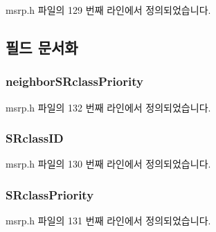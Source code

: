 msrp.\+h 파일의 129 번째 라인에서 정의되었습니다.



\subsection{필드 문서화}
\subsubsection[{\texorpdfstring{neighbor\+S\+Rclass\+Priority}{neighborSRclassPriority}}]{ neighbor\+S\+Rclass\+Priority}\hypertarget{structmsrpdu__domain_ae9e61b028a38f302a5888dc230ec3bf2}{}\label{structmsrpdu__domain_ae9e61b028a38f302a5888dc230ec3bf2}


msrp.\+h 파일의 132 번째 라인에서 정의되었습니다.

\subsubsection[{\texorpdfstring{S\+Rclass\+ID}{SRclassID}}]{ S\+Rclass\+ID}\hypertarget{structmsrpdu__domain_a93cbc1ec12e4b8c62aa3cafcbe9aa92e}{}\label{structmsrpdu__domain_a93cbc1ec12e4b8c62aa3cafcbe9aa92e}


msrp.\+h 파일의 130 번째 라인에서 정의되었습니다.

\subsubsection[{\texorpdfstring{S\+Rclass\+Priority}{SRclassPriority}}]{ S\+Rclass\+Priority}\hypertarget{structmsrpdu__domain_adcf8b02949ce4e07bd3d61fb4082ab66}{}\label{structmsrpdu__domain_adcf8b02949ce4e07bd3d61fb4082ab66}


msrp.\+h 파일의 131 번째 라인에서 정의되었습니다.

